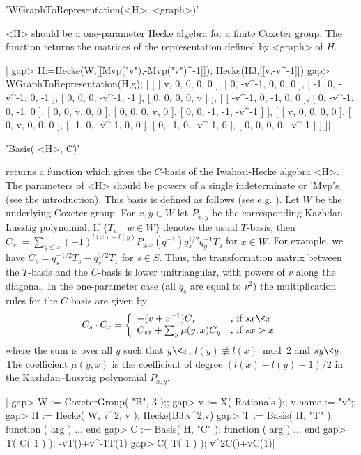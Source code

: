 'WGraphToRepresentation(<H>, <graph>)'

<H> should be a one-parameter Hecke algebra for a finite Coxeter group. The
function  returns the matrices of the  representation defined by <graph> of
$H$.

|    gap> H:=Hecke(W,[[Mvp("v"),-Mvp("v")^-1]]);
    Hecke(H3,[[v,-v^-1]])
    gap> WGraphToRepresentation(H,g);
    [ [ [ v, 0, 0, 0, 0 ], [ 0, -v^-1, 0, 0, 0 ], [ -1, 0, -v^-1, 0, -1 ],
          [ 0, 0, 0, -v^-1, -1 ], [ 0, 0, 0, 0, v ] ],
      [ [ -v^-1, 0, -1, 0, 0 ], [ 0, -v^-1, 0, -1, 0 ], [ 0, 0, v, 0, 0 ],
          [ 0, 0, 0, v, 0 ], [ 0, 0, -1, -1, -v^-1 ] ],
      [ [ v, 0, 0, 0, 0 ], [ 0, v, 0, 0, 0 ], [ -1, 0, -v^-1, 0, 0 ],
          [ 0, -1, 0, -v^-1, 0 ], [ 0, 0, 0, 0, -v^-1 ] ] ]|


'Basis( <H>, \"C\" )'

returns  a function which gives the  $C$-basis of the Iwahori-Hecke algebra
<H>.  The parameters of <H>  should be powers of  a single indeterminate or
'Mvp's  (see the introduction). This basis  is defined as follows (see e.g.
\cite[(5.1)]{Lus85}). Let $W$ be the underlying Coxeter group. For $x,y \in
W$  let  $P_{x,y}$  be  the  corresponding  Kazhdan--Lusztig polynomial. If
$\{T_w  \mid w\in W\}$ denotes the usual $T$-basis, then $C_x\:=\sum_{y \le
x} (-1)^{l(x)-l(y)}P_{y,x}(q^{-1})q_x^{1/2}q_y^{-1} T_y$ for $x \in W$. For
example,  we have $C_s=q_s^{-1/2}T_s-q_s^{1/2}T_1$ for $s \in S$. Thus, the
transformation  matrix  between  the  $T$-basis  and the $C$-basis is lower
unitriangular,  with powers of $v$ along the diagonal. In the one-parameter
case  (all $q_s$ are equal  to $v^2$) the multiplication  rules for the $C$
basis   are  given  by\:  $$   C_s  \cdot  C_x  =\left\{  \begin{array}{ll}
-(v+v^{-1})C_x  &  \mbox{,  if  $sx\<x$}\\  C_{sx}+\sum_{y}  \mu(y,x)C_y  &
\mbox{,  if $sx>x$}\end{array}\right.$$ where the sum  is over all $y$ such
that  $y\<x$, $l(y)  \not\equiv l(x)$~mod~$2$  and $sy\<y$. The coefficient
$\mu(y,x)$   is  the   coefficient  of   degree  $(l(x)-l(y)-1)/2$  in  the
Kazhdan--Lusztig polynomial $P_{x,y}$.

|    gap> W := CoxeterGroup( "B", 3 );;
    gap> v := X( Rationals );; v.name := "v";;
    gap> H := Hecke( W, v^2, v );
    Hecke(B3,v^2,v)
    gap> T := Basis( H, "T" );
    function ( arg ) ... end
    gap> C := Basis( H, "C" );
    function ( arg ) ... end
    gap> T( C( 1 ) );
    -vT()+v^-1T(1)
    gap> C( T( 1 ) );
    v^2C()+vC(1)|


